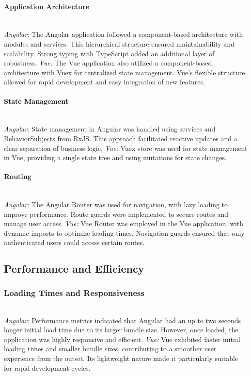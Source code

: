 \documentclass[conference]{IEEEtran}
\begin{document}
\paragraph{Application Architecture}
\textit{\\Angular: }The Angular application followed a component-based architecture with modules and services. This hierarchical structure ensured maintainability and scalability. Strong typing with TypeScript added an additional layer of robustness.
\newline\textit{Vue: }The Vue application also utilized a component-based architecture with Vuex for centralized state management. Vue's flexible structure allowed for rapid development and easy integration of new features.
\paragraph{State Management}
\textit{\\Angular: }State management in Angular was handled using services and BehaviorSubjects from RxJS. This approach facilitated reactive updates and a clear separation of business logic.
\newline\textit{Vue: }Vuex store was used for state management in Vue, providing a single state tree and using mutations for state changes.
\paragraph{Routing}
\textit{\\Angular: }The Angular Router was used for navigation, with lazy loading to improve performance. Route guards were implemented to secure routes and manage user access.
\newline\textit{Vue: }Vue Router was employed in the Vue application, with dynamic imports to optimize loading times. Navigation guards ensured that only authenticated users could access certain routes.

\subsection{Performance and Efficiency}
\subsubsection{Loading Times and Responsiveness}
\textit{\\Angular: }Performance metrics indicated that Angular had an up to two seconds longer initial load time due to its larger bundle size. However, once loaded, the application was highly responsive and efficient.
\newline\textit{Vue: }Vue exhibited faster initial loading times and smaller bundle sizes, contributing to a smoother user experience from the outset. Its lightweight nature made it particularly suitable for rapid development cycles.
\end{document}
